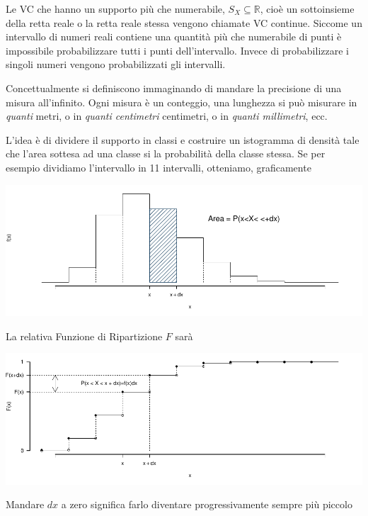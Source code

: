 \documentclass[
  11pt,
]{book}
\theoremstyle{mytheoremstyle}
\theoremstyle{mydefstyle}
\begin{document}
Le VC che hanno un supporto più che numerabile, \(S_X\subseteq\mathbb{R}\),
cioè un sottoinsieme della retta reale o la retta reale stessa vengono chiamate
VC continue. Siccome un intervallo di numeri reali contiene una quantità più che numerabile
di punti è impossibile probabilizzare tutti i punti dell'intervallo. Invece di probabilizzare
i singoli numeri vengono probabilizzati gli intervalli.

Concettualmente si definiscono immaginando di mandare la precisione di una misura
all'infinito. Ogni misura è un conteggio, una lunghezza si può misurare in \emph{quanti} metri,
o in \emph{quanti centimetri} centimetri, o in \emph{quanti millimetri}, ecc.

L'idea è di dividere il supporto in classi e costruire un istogramma di densità
tale che l'area sottesa ad una classe si la probabilità della classe stessa.
Se per esempio dividiamo l'intervallo in 11 intervalli, otteniamo, graficamente

\begin{center}\includegraphics{Appunti_di_Statistica_2025_files/figure-latex/06-Variabili-Casuali-8-1} \end{center}

La relativa Funzione di Ripartizione \(F\) sarà

\begin{center}\includegraphics{Appunti_di_Statistica_2025_files/figure-latex/06-Variabili-Casuali-9-1} \end{center}

Mandare \(dx\) a zero significa farlo diventare progressivamente sempre più piccolo
\end{document}
